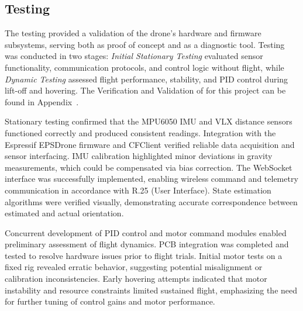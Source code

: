 \subsection{Testing}





The testing provided a validation of the drone's hardware and firmware subsystems, serving both as proof of concept and as a diagnostic tool. Testing was conducted in two stages: \textit{Initial Stationary Testing} evaluated sensor functionality, communication protocols, and control logic without flight, while \textit{Dynamic Testing} assessed flight performance, stability, and PID control during lift-off and hovering. The Verification and Validation of for this project can be found in Appendix~.

Stationary testing confirmed that the MPU6050 IMU and VLX distance sensors functioned correctly and produced consistent readings. Integration with the Espressif EPSDrone firmware and CFClient verified reliable data acquisition and sensor interfacing. IMU calibration highlighted minor deviations in gravity measurements, which could be compensated via bias correction. The WebSocket interface was successfully implemented, enabling wireless command and telemetry communication in accordance with R.25 (User Interface). State estimation algorithms were verified visually, demonstrating accurate correspondence between estimated and actual orientation.

Concurrent development of PID control and motor command modules enabled preliminary assessment of flight dynamics. PCB integration was completed and tested to resolve hardware issues prior to flight trials. Initial motor tests on a fixed rig revealed erratic behavior, suggesting potential misalignment or calibration inconsistencies. Early hovering attempts indicated that motor instability and resource constraints limited sustained flight, emphasizing the need for further tuning of control gains and motor performance. 

